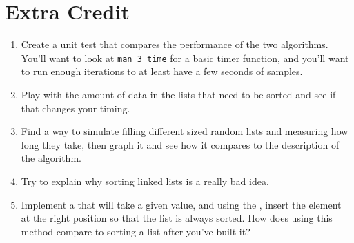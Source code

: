 \section{Extra Credit}

\begin{enumerate}
\item Create a unit test that compares the performance of the two algorithms.  You'll want to look at \verb|man 3 time| for a basic timer function,
    and you'll want to run enough iterations to at least have a few seconds of samples.
\item Play with the amount of data in the lists that need to be sorted and see if that changes your timing.
\item Find a way to simulate filling different sized random lists and measuring how long they take, then graph it and see how it compares to the
    description of the algorithm.
\item Try to explain why sorting linked lists is a really bad idea.
\item Implement a  that will take a given value, and using the , insert the element at the
    right position so that the list is always sorted.  How does using this method compare to sorting a list after you've built it?
\end{enumerate}

